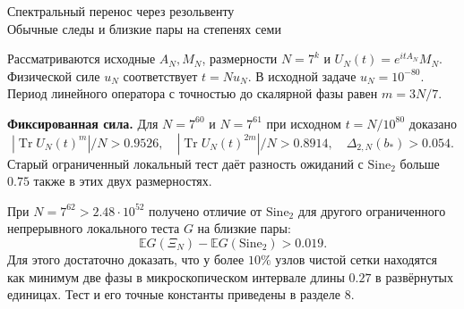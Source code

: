 \documentclass[11pt,a4paper]{article}
\newcommand{\Tr}{\operatorname{Tr}}
\newcommand{\EE}{\mathbb E}
\newcommand{\si}{\mathrm{Sine}_2}
\newcommand{\subt}[1]{\par\medskip\noindent\textbf{#1.}\quad}
\begin{document}
\begin{center}{\LARGE\sffamily Спектральный перенос через резольвенту}\\[4pt]
{\large Обычные следы и близкие пары на степенях семи}
\end{center}
Рассматриваются исходные \(A_N,M_N\), размерности \(N=7^k\) и \(U_N(t)=e^{itA_N}M_N\). Физической силе \(u_N\) соответствует \(t=Nu_N\). В исходной задаче \(u_N=10^{-80}\). Период линейного оператора с точностью до скалярной фазы равен \(m=3N/7\).

\subt{Фиксированная сила}
Для \(N=7^{60}\) и \(N=7^{61}\) при исходном \(t=N/10^{80}\) доказано
\[
 |\Tr U_N(t)^m|/N>0.9526,\quad
 |\Tr U_N(t)^{2m}|/N>0.8914,\quad
 \Delta_{2,N}(b_*)>0.054.
\]
Старый ограниченный локальный тест даёт разность ожиданий с \(\si\) больше \(0.75\) также в этих двух размерностях.

При \(N=7^{62}>2.48\cdot10^{52}\) получено отличие от \(\si\) для другого ограниченного непрерывного локального теста \(G\) на близкие пары:
\[
                \EE G(\Xi_N)-\EE G(\si)>0.019 .
\]
Для этого достаточно доказать, что у более \(10\%\) узлов чистой сетки находятся как минимум две фазы в микроскопическом интервале длины \(0.27\) в развёрнутых единицах. Тест и его точные константы приведены в разделе 8.
\end{document}
